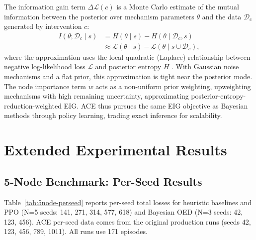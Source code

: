 \documentclass[twoside]{article}
\theoremstyle{plain}
\theoremstyle{definition}
\theoremstyle{remark}
\begin{document}
The information gain term $\Delta\mathcal{L}(c)$ is a Monte Carlo estimate of the mutual information between the posterior over mechanism parameters $\theta$ and the data $\mathcal{D}_c$ generated by intervention $c$:
\begin{align}
I(\theta; \mathcal{D}_c \mid s) &= H(\theta \mid s) - H(\theta \mid \mathcal{D}_c, s) \\
&\approx \mathcal{L}(\theta \mid s) - \mathcal{L}(\theta \mid s \cup \mathcal{D}_c),
\end{align}
where the approximation uses the local-quadratic (Laplace) relationship between negative log-likelihood loss $\mathcal{L}$ and posterior entropy $H$ \citep{rainforth2024modern}. With Gaussian noise mechanisms and a flat prior, this approximation is tight near the posterior mode. The node importance term $w$ acts as a non-uniform prior weighting, upweighting mechanisms with high remaining uncertainty, approximating posterior-entropy-reduction-weighted EIG. ACE thus pursues the same EIG objective as Bayesian methods through policy learning, trading exact inference for scalability.

\section{Extended Experimental Results}
\label{app:experiments}

\subsection{5-Node Benchmark: Per-Seed Results}
\label{app:5node-detail}

Table~\ref{tab:5node-perseed} reports per-seed total losses for heuristic baselines and PPO (N=5 seeds: 141, 271, 314, 577, 618) and Bayesian OED (N=3 seeds: 42, 123, 456). ACE per-seed data comes from the original production runs (seeds 42, 123, 456, 789, 1011). All runs use 171 episodes.
\end{document}

